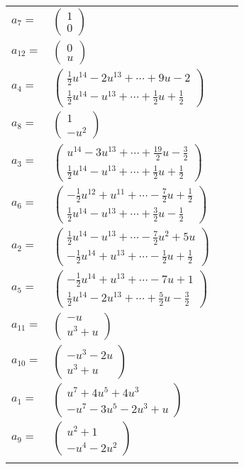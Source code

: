\documentclass[1p]{elsarticle_modified}
\theoremstyle{definition}
\begin{document}
\begin{tabular}{m{7pt} m{180pt} m{7pt} m{180pt} }
\flushright $a_{7}=$&$\begin{pmatrix}1\\0\end{pmatrix}$ \\
\flushright $a_{12}=$&$\begin{pmatrix}0\\u\end{pmatrix}$ \\
\flushright $a_{4}=$&$\begin{pmatrix}\frac{1}{2} u^{14}-2 u^{13}+\cdots+9 u-2\\\frac{1}{2} u^{14}- u^{13}+\cdots+\frac{1}{2} u+\frac{1}{2}\end{pmatrix}$ \\
\flushright $a_{8}=$&$\begin{pmatrix}1\\- u^2\end{pmatrix}$ \\
\flushright $a_{3}=$&$\begin{pmatrix}u^{14}-3 u^{13}+\cdots+\frac{19}{2} u-\frac{3}{2}\\\frac{1}{2} u^{14}- u^{13}+\cdots+\frac{1}{2} u+\frac{1}{2}\end{pmatrix}$ \\
\flushright $a_{6}=$&$\begin{pmatrix}-\frac{1}{2} u^{12}+u^{11}+\cdots-\frac{7}{2} u+\frac{1}{2}\\\frac{1}{2} u^{14}- u^{13}+\cdots+\frac{3}{2} u-\frac{1}{2}\end{pmatrix}$ \\
\flushright $a_{2}=$&$\begin{pmatrix}\frac{1}{2} u^{14}- u^{13}+\cdots-\frac{7}{2} u^2+5 u\\-\frac{1}{2} u^{14}+u^{13}+\cdots-\frac{1}{2} u+\frac{1}{2}\end{pmatrix}$ \\
\flushright $a_{5}=$&$\begin{pmatrix}-\frac{1}{2} u^{14}+u^{13}+\cdots-7 u+1\\\frac{1}{2} u^{14}-2 u^{13}+\cdots+\frac{5}{2} u-\frac{3}{2}\end{pmatrix}$ \\
\flushright $a_{11}=$&$\begin{pmatrix}- u\\u^3+u\end{pmatrix}$ \\
\flushright $a_{10}=$&$\begin{pmatrix}- u^3-2 u\\u^3+u\end{pmatrix}$ \\
\flushright $a_{1}=$&$\begin{pmatrix}u^7+4 u^5+4 u^3\\- u^7-3 u^5-2 u^3+u\end{pmatrix}$ \\
\flushright $a_{9}=$&$\begin{pmatrix}u^2+1\\- u^4-2 u^2\end{pmatrix}$\\&\end{tabular}
\end{document}
